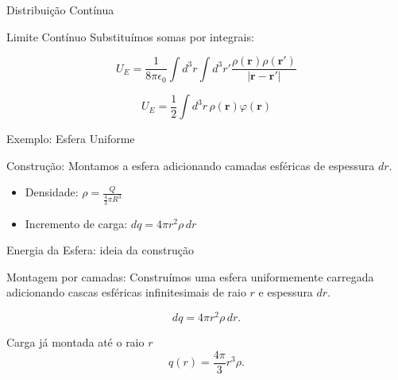 \documentclass[aspectratio=169,11pt]{beamer}
\begin{document}
\begin{frame}{Distribuição Contínua}

\begin{mybox}{Limite Contínuo}
Substituímos somas por integrais:
\end{mybox}

\begin{eqbox}
\begin{equation}
U_E
=
\frac{1}{8\pi\epsilon_0}
\int d^3r
\int d^3r'
\frac{\rho(\mathbf r)\rho(\mathbf r')}{|\mathbf r - \mathbf r'|}
\tag{3.76}
\end{equation}
\end{eqbox}

\begin{eqbox}
\begin{equation}
U_E
=
\frac{1}{2}
\int d^3r\, \rho(\mathbf r)\varphi(\mathbf r)
\tag{3.76}
\end{equation}
\end{eqbox}

\end{frame}

\begin{frame}{Exemplo: Esfera Uniforme}

\begin{mybox}{Construção: }
Montamos a esfera adicionando camadas esféricas de espessura $dr$.
\end{mybox}

\begin{itemize}
\item Densidade: $\rho = \frac{Q}{\frac{4}{3}\pi R^3}$
\item Incremento de carga: $dq = 4\pi r^2 \rho\, dr$
\end{itemize}

\end{frame}

\begin{frame}{Energia da Esfera: ideia da construção}

\begin{mybox}{Montagem por camadas: }
Construímos uma esfera uniformemente carregada adicionando cascas esféricas infinitesimais de raio $r$ e espessura $dr$.
\end{mybox}

\begin{eqbox}
\begin{equation}
dq = 4\pi r^2 \rho\, dr .
\label{eq:dq_camada}
\end{equation}
\end{eqbox}

\begin{mybox}{Carga já montada até o raio $r$}
\begin{equation}
q(r)=\frac{4\pi}{3}r^3\rho .
\label{eq:carga_interna_r}
\end{equation}
\end{mybox}

\end{frame}
\end{document}
